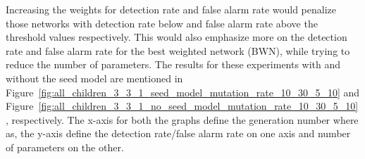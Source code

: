 Increasing the weights for detection rate and false alarm rate would penalize those networks with detection rate below and false alarm rate above the threshold values respectively. This would also emphasize more on the detection rate and false alarm rate for the best weighted network (BWN), while trying to reduce the number of parameters. The results for these experiments with and without the seed model are mentioned in Figure~\ref{fig:all_children_3_3_1_seed_model_mutation_rate_10_30_5_10} and Figure~\ref{fig:all_children_3_3_1_no_seed_model_mutation_rate_10_30_5_10}, respectively. The x-axis for both the graphs define the generation number where as, the y-axis define the detection rate/false alarm rate on one axis and number of parameters on the other. 

\begingroup
\setlength{\tabcolsep}{5pt}
\renewcommand{\arraystretch}{1.2}
\begin{table}[h!]
\normalsize
{}
\caption{Mutation rate (MR) and weights for metrics}
\label{table:all_children_3_3_1_mutation_rate_10_30_5_10}
\end{table}
\endgroup

